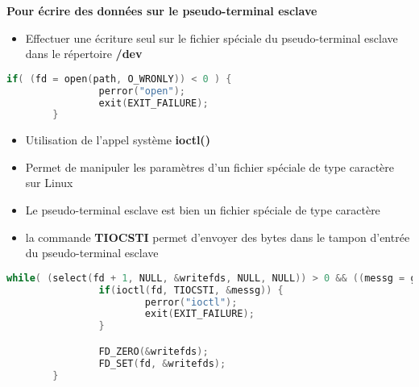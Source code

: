\begin{frame}[fragile]
	\textbf{Pour écrire des données sur le pseudo-terminal esclave}
	\begin{itemize}
		\item Effectuer une écriture seul sur le fichier spéciale du pseudo-terminal esclave dans le répertoire \textbf{/dev}
	\end{itemize}

	\begin{lstlisting}[language=C]
	if( (fd = open(path, O_WRONLY)) < 0 ) {
                perror("open");
                exit(EXIT_FAILURE);
        }
	\end{lstlisting}
\end{frame}

\begin{frame}[fragile]
	\begin{itemize}
		\item Utilisation de l'appel système \textbf{ioctl()}
		\item Permet de manipuler les paramètres d'un fichier spéciale de type caractère sur Linux
		\item Le pseudo-terminal esclave est bien un fichier spéciale de type caractère
		\item la commande \textbf{TIOCSTI} permet d'envoyer des bytes dans le tampon d'entrée du pseudo-terminal esclave
	\end{itemize}

	\begin{lstlisting}[language=C]
	while( (select(fd + 1, NULL, &writefds, NULL, NULL)) > 0 && ((messg = getchar()) != 'q') ) {
                if(ioctl(fd, TIOCSTI, &messg)) {
                        perror("ioctl");
                        exit(EXIT_FAILURE);
                }

                FD_ZERO(&writefds);
                FD_SET(fd, &writefds);
        }
	\end{lstlisting}
\end{frame}
